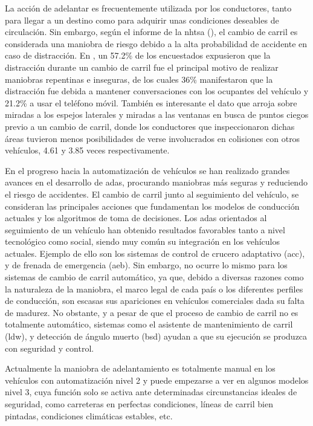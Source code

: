 La acción de adelantar es frecuentemente utilizada por los conductores, tanto para llegar a un destino como para adquirir unas condiciones deseables de circulación. Sin embargo, según el informe de la \gls{nhtsa} (\cite{sen}), el cambio de carril es considerada una maniobra de riesgo debido a la alta probabilidad de accidente en caso de distracción. En \textcite{shawky}, un 57.2\% de los encuestados expusieron que la distracción durante un cambio de carril fue el principal motivo de realizar maniobras repentinas e inseguras, de los cuales 36\% manifestaron que la distracción fue debida a mantener conversaciones con los ocupantes del vehículo y 21.2\% a usar el teléfono móvil. También es interesante el dato que arroja sobre miradas a los espejos laterales y miradas a las ventanas en busca de puntos ciegos previo a un cambio de carril, donde los conductores que inspeccionaron dichas áreas tuvieron menos posibilidades de verse involucrados en colisiones con otros vehículos, 4.61 y 3.85 veces respectivamente. 

En el progreso hacia la automatización de vehículos se han realizado grandes avances en el desarrollo de \gls{adas}, procurando maniobras más seguras y reduciendo el riesgo de accidentes. El cambio de carril junto al seguimiento del vehículo, se consideran las principales acciones que fundamentan los modelos de conducción actuales y los algoritmos de toma de decisiones. Los \gls{adas} orientados al seguimiento de un vehículo han obtenido resultados favorables tanto a nivel tecnológico como social, siendo muy común su integración en los vehículos actuales. Ejemplo de ello son los sistemas de control de crucero adaptativo (\gls{acc}), y de frenada de emergencia (\gls{aeb}). Sin embargo, no ocurre lo mismo para los sistemas de cambio de carril automático, ya que, debido a diversas razones como la naturaleza de la maniobra, el marco legal de cada país o los diferentes perfiles de conducción, son escasas sus apariciones en vehículos comerciales dada su falta de madurez. No obstante, y a pesar de que el proceso de cambio de carril no es totalmente automático, sistemas como el asistente de mantenimiento de carril (\gls{ldw}), y detección de ángulo muerto (\gls{bsd}) ayudan a que su ejecución se produzca con seguridad y control.

Actualmente la maniobra de adelantamiento es totalmente manual en los vehículos con automatización nivel 2 y puede empezarse a ver en algunos modelos nivel 3, cuya función solo se activa ante determinadas circunstancias ideales de seguridad, como carreteras en perfectas condiciones, líneas de carril bien pintadas, condiciones climáticas estables, etc.

